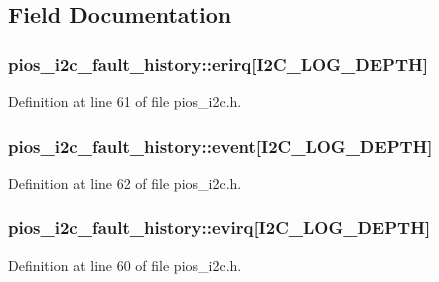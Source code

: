 \subsection{Field Documentation}
\hypertarget{structpios__i2c__fault__history_a7ffc99c5d0823e35355480c857e7dc6a}{
\subsubsection[{erirq}]{ pios\-\_\-i2c\-\_\-fault\-\_\-history\-::erirq\mbox{[}I2\-C\-\_\-\-L\-O\-G\-\_\-\-D\-E\-P\-T\-H\mbox{]}}}\label{structpios__i2c__fault__history_a7ffc99c5d0823e35355480c857e7dc6a}


Definition at line 61 of file pios\-\_\-i2c.\-h.

\hypertarget{structpios__i2c__fault__history_a1c5b34cc902d5ba1916914dc3cf7d5ba}{
\subsubsection[{event}]{ pios\-\_\-i2c\-\_\-fault\-\_\-history\-::event\mbox{[}I2\-C\-\_\-\-L\-O\-G\-\_\-\-D\-E\-P\-T\-H\mbox{]}}}\label{structpios__i2c__fault__history_a1c5b34cc902d5ba1916914dc3cf7d5ba}


Definition at line 62 of file pios\-\_\-i2c.\-h.

\hypertarget{structpios__i2c__fault__history_a77d686b8830f4fa32f9a2930df82be4d}{
\subsubsection[{evirq}]{ pios\-\_\-i2c\-\_\-fault\-\_\-history\-::evirq\mbox{[}I2\-C\-\_\-\-L\-O\-G\-\_\-\-D\-E\-P\-T\-H\mbox{]}}}\label{structpios__i2c__fault__history_a77d686b8830f4fa32f9a2930df82be4d}


Definition at line 60 of file pios\-\_\-i2c.\-h.

